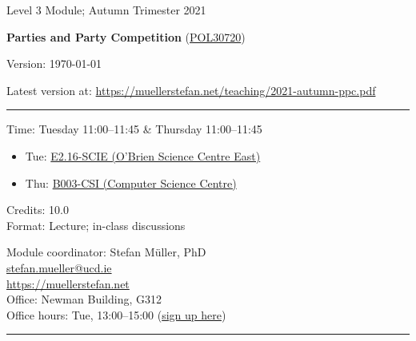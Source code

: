 \documentclass[abstract=on,parskip=full,headings=standardclasses,fontsize=11pt,paper=a4]{scrartcl}
\begin{document}
\singlespacing
\vspace{1cm}

\begin{center}
{\large Level 3 Module; 
Autumn Trimester 2021} \\ 
\bigskip

{\Large \textbf{Parties and Party Competition} (\href{https://hub.ucd.ie/usis/!W_HU_MENU.P_PUBLISH?p_tag=MODULE&MODULE=POL30720}{POL30720})} 
\\
\bigskip


{\large  
}
Version: \today
\\
\bigskip

Latest version at: \url{https://muellerstefan.net/teaching/2021-autumn-ppc.pdf}
\end{center}

\vspace{1.5cm}



\hrule
\medskip
\begin{minipage}[t]{0.5\textwidth}
Time: Tuesday 11:00--11:45 \& Thursday 11:00--11:45
\begin{itemize} \renewcommand\labelitemi{--} \small 
\item Tue: \href{https://goo.gl/maps/vCQP95QtKrTWGDMx7}{E2.16-SCIE (O'Brien Science Centre East)}
\item Thu: \href{https://goo.gl/maps/gKF6596m1vvxFeeHA}{B003-CSI (Computer Science Centre)} 
\end{itemize}
Credits: 10.0 \\
Format: Lecture; in-class discussions
\end{minipage}
\begin{minipage}[t]{0.49\textwidth}
\begin{flushright}
Module coordinator: Stefan Müller, PhD \\
 \href{mailto:stefan.mueller@ucd.ie}{\textsf{stefan.mueller@ucd.ie}} \\
 \url{https://muellerstefan.net} \\
Office:  Newman Building, G312 \\
Office hours: Tue, 13:00--15:00 (\href{https://calendly.com/mueller-ucd/office-hours}{sign up here})
\end{flushright}
\end{minipage}

\medskip
\hrule 
\end{document}
